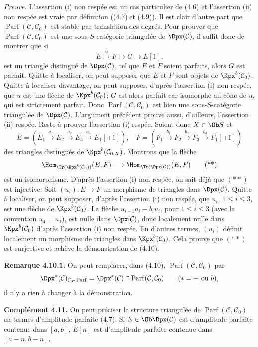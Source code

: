 \documentclass[11pt]{article}
\newcommand{\Parf}{\operatorname{Parf}}
\begin{document}
\emph{Preuve.} L'assertion (i) non respée est un cas particulier de (4.6) et l'assertion (ii) non respée est vraie par définition ((4.7) et (4.9)). Il est clair d'autre part que \(\Parf(\mathcal C,\mathcal C_0)\) est stable par translation des degrés. Pour prouver que \(\Parf(\mathcal C,\mathcal C_0)\) est une sous-\(S\)-catégorie triangulée de \(\Dpx(\mathcal C)\), il suffit donc de montrer que si
\[
  E\xrightarrow{u}F\longrightarrow G\longrightarrow E[1].
  \tag{*}
\]
est un triangle distingué de \(\Dpx(\mathcal C)\), tel que \(E\) et \(F\) soient parfaits, alors \(G\) est parfait. Quitte à localiser, on peut supposer que \(E\) et \(F\) sont objets de \(\Kpx^b(\mathcal C_0)\). Quitte à localiser davantage, on peut supposer, d'après l'assertion (i) non respée, que \(u\) est une flèche de \(\Kpx^b(\mathcal C_0)\); \(G\) est alors parfait car isomorphe au cône de \(u\), qui est strictement parfait. Donc \(\Parf(\mathcal C,\mathcal C_0)\) est bien une sous-\(S\)-catégorie triangulée de \(\Dpx(\mathcal C)\). L'argument précédent prouve aussi, d'ailleurs, l'assertion (ii) respée. Reste à prouver l'assertion (i) respée. Soient donc \(X\in\Ob S\) et
\[
E=(E_1\xrightarrow{a_1}E_2\xrightarrow{a_2}E_3\xrightarrow{a_3}E_1[+1]),
\quad
F=(F_1\xrightarrow{b_1}F_2\xrightarrow{b_2}F_3\xrightarrow{b_3}F_1[+1])
\]
des triangles distingués de \(\Kpx^b(\mathcal C_{0,X})\). Montrons que la flèche
\[
  \Hom_{\Tr(\Kpx^b(\mathcal C_0))}(E,F)
  \longrightarrow
  \Hom_{\Tr(\Dpx(\mathcal C))}(E,F)
  \tag{**}
\]
est un isomorphisme. D'après l'assertion (i) non respée, on sait déjà que \((**)\) est injective. Soit \((u_i):E\to F\) un morphisme de triangles dans \(\Dpx(\mathcal C)\). Quitte à localiser, on peut supposer, d'après l'assertion (i) non respée, que \(u_i\), \(1\leq i\leq3\), est une flèche de \(\Kpx^b(\mathcal C_0)\). La flèche \(u_{i+1}a_i-b_iu_i\), pour \(1\leq i\leq3\) (avec la convention \(u_4=u_1\)), est nulle dans \(\Dpx(\mathcal C)\), donc localement nulle dans \(\Kpx^b(\mathcal C_0)\) d'après l'assertion (i) non respée. En d'autres termes, \((u_i)\) définit localement un morphisme de triangles dans \(\Kpx^b(\mathcal C_0)\). Cela prouve que \((**)\) est surjective et achève la démonstration de (4.10).

\textbf{Remarque 4.10.1.} On peut remplacer, dans (4.10), \(\Parf(\mathcal C,\mathcal C_0)\) par
\[
  \Dpx^*(\mathcal C)_{\mathcal C_0\text{-}\Parf}
  =\Dpx^*(\mathcal C)\cap\Parf(\mathcal C,\mathcal C_0)
  \qquad(*=-\text{ ou }b),
\]
il n'y a rien à changer à la démonstration.

\textbf{Complément 4.11.} On peut préciser la structure triangulée de \(\Parf(\mathcal C,\mathcal C_0)\) en termes d'amplitude parfaite (4.7). Si \(E\in\Ob\Dpx(\mathcal C)\) est d'amplitude parfaite contenue dans \([a,b]\), \(E[n]\) est d'amplitude parfaite contenue dans \([a-n,b-n]\).
\end{document}
